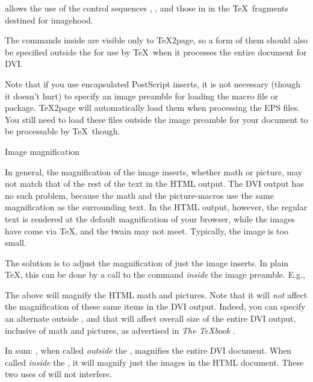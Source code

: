 {{{{{{{{{{{{{{

\n  allows the use of the control sequences \p{\gO},
\p{\I}, and those in  in the
\TeX\ fragments destined for imagehood.

The commands inside \p{\imgpreamble} are visible only
to \TeX2page, so a form of them should also be
specified outside the \p{\imgpreamble} for use by \TeX\
when it processes the entire document for DVI.

Note that if you use encapsulated PostScript inserts,
it is not necessary (though it doesn't hurt) to
specify an image preamble for loading the 
macro file or  package.  \TeX2page will
automatically load them when processing the EPS files.
You still need to load these files outside the image
preamble for your document to be processable by \TeX\
though.

\beginsection Image magnification

%
In general, the magnification of the image
inserts, whether math or picture, may not match that
of the rest of the text in the HTML output.  The DVI
output has no such problem, because the math and
the picture-macros use the same magnification as the
surrounding text.  In the HTML output, however, the
regular text is rendered at the default magnification
of your browser, while the images have come via \TeX,
and the twain may not meet.  Typically, the image is
too small.

The solution is to adjust the magnification of  just
the image inserts.  In plain \TeX, this can be
done by a call to the \p{\magnification} command {\em
inside} the image preamble.  E.g.,


\n The above will magnify the HTML math and pictures.
Note that it will {\em not} affect the magnification
of these same items in the DVI output.  Indeed,
you can specify an alternate \p{\magnification}
outside \p{\imgpreamble}, and that will affect
overall size of the entire DVI output, inclusive of
math and pictures, as advertised in {\em The \TeX book}
\cite{tex}.

In sum: \p{\magnification}, when called {\em
outside} the \p{\imgpreamble}, magnifies the
entire DVI document.  When called {\em inside}
the \p{\imgpreamble}, it will magnify  just the
images in the HTML document.  These two uses
of \p{\magnification} will not interfere.

}}}}}}}}}}}}}}

